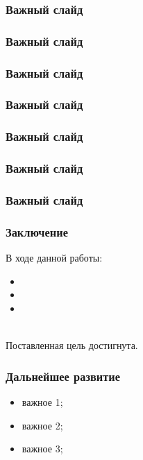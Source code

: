\documentclass{bmstu-pr}
\begin{document}
\begin{frame}
    \frametitle{Важный слайд}

\end{frame}

\begin{frame}
    \frametitle{Важный слайд}
\end{frame}

\begin{frame}
    \frametitle{Важный слайд}
\end{frame}

\begin{frame}
    \frametitle{Важный слайд}
\end{frame}

\begin{frame}
    \frametitle{Важный слайд}
\end{frame}


\begin{frame}
    \frametitle{Важный слайд}

\end{frame}

\begin{frame}
    \frametitle{Важный слайд}

\end{frame}

\begin{frame}
    \frametitle{Заключение}
    В ходе данной работы:
    \begin{itemize}
        \item
        \item
        \item
    \end{itemize}
    ~\\

    Поставленная цель достигнута.
\end{frame}

\begin{frame}
    \frametitle{Дальнейшее развитие}
    \begin{itemize}
        \item важное 1;
        \item важное 2;
        \item важное 3;
    \end{itemize}
    ~\\
\end{frame}
\end{document}
